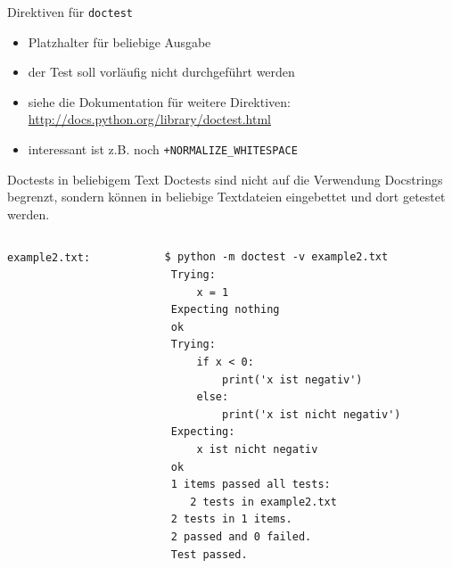 \documentclass[t, utf8x, 10pt]{beamer}
\begin{document}
\begin{frame}[fragile]{Direktiven für \texttt{doctest}}
 \begin{itemize}
  \item Platzhalter für beliebige Ausgabe
 \end{itemize}
 \begin{footnotesize}
  
 \end{footnotesize}

 \begin{itemize}
  \item der Test soll vorläufig nicht durchgeführt werden
 \end{itemize}
 \begin{footnotesize}
  
 \end{footnotesize}

 \begin{itemize}
  \item siehe die Dokumentation für weitere Direktiven:
	\url{http://docs.python.org/library/doctest.html}
  \item interessant ist z.B. noch \texttt{+NORMALIZE\_WHITESPACE}
 \end{itemize}
\end{frame}


\begin{frame}[fragile]{Doctests in beliebigem Text}
 Doctests sind nicht auf die Verwendung Docstrings begrenzt, sondern können in
 beliebige Textdateien eingebettet und dort getestet werden.

 \begin{columns}
  \begin{column}{0.5\textwidth}
   \texttt{example2.txt:}
   \begin{footnotesize}
    
   \end{footnotesize}
  \end{column}
  \begin{column}{0.5\textwidth}
   \begin{footnotesize}
    \begin{lstlisting}[language={}]
 $ python -m doctest -v example2.txt
 Trying:
     x = 1
 Expecting nothing
 ok
 Trying:
     if x < 0:
         print('x ist negativ')
     else:
         print('x ist nicht negativ')
 Expecting:
     x ist nicht negativ
 ok
 1 items passed all tests:
    2 tests in example2.txt
 2 tests in 1 items.
 2 passed and 0 failed.
 Test passed.
    \end{lstlisting}
   \end{footnotesize}
  \end{column}
 \end{columns}
\end{frame}
\end{document}
